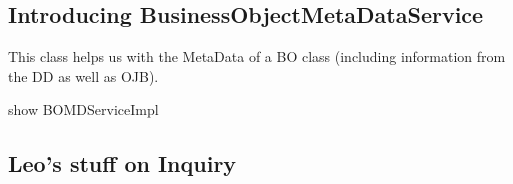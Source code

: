 \begin{ifhtml}
\begin{s5slide}
        \section{Introducing BusinessObjectMetaDataService}
            This class helps us with the MetaData of a BO class (including information from the DD as well as OJB).
            \begin{s5notes}
                show BOMDServiceImpl
            \end{s5notes}
    \end{s5slide}
    \begin{s5slide}
        \section{Leo's stuff on Inquiry}
            
    \end{s5slide}
\end{ifhtml}